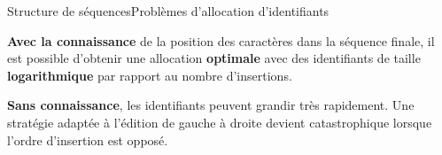 
  
  

  
%     


\begin{frame}{Structure de séquences}{Problèmes d'allocation d'identifiants}

  \textbf{Avec la connaissance} de la position des caractères dans la séquence
  finale, il est possible d'obtenir une allocation \textbf{optimale} avec des
  identifiants de taille \textbf{logarithmique} par rapport au nombre d'insertions.

  \vspace{0.1cm}

  \begin{center}
  
  \end{center}

  \vspace{0.25cm}

  \textbf{Sans connaissance}, les identifiants peuvent grandir très
  rapidement. Une stratégie adaptée à l'édition de gauche à droite devient
  catastrophique lorsque l'ordre d'insertion est opposé.

  
  \vspace{0.1cm}

  \begin{center}
    
  \end{center}

\end{frame}


